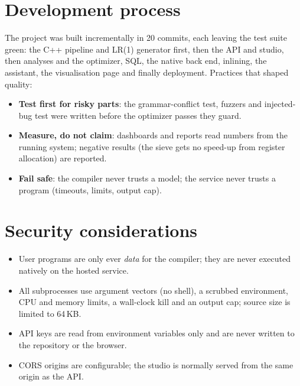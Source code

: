 \documentclass[11pt,a4paper]{article}
\begin{document}
\section{Development process}
The project was built incrementally in 20 commits, each leaving the test suite green: the C++ pipeline and LR(1) generator first, then the API and studio, then analyses and the optimizer, SQL, the native back end, inlining, the assistant, the visualisation page and finally deployment. Practices that shaped quality:
\begin{itemize}
\item \textbf{Test first for risky parts}: the grammar-conflict test, fuzzers and injected-bug test were written before the optimizer passes they guard.
\item \textbf{Measure, do not claim}: dashboards and reports read numbers from the running system; negative results (the sieve gets no speed-up from register allocation) are reported.
\item \textbf{Fail safe}: the compiler never trusts a model; the service never trusts a program (timeouts, limits, output cap).
\end{itemize}

\section{Security considerations}
\begin{itemize}
\item User programs are only ever \emph{data} for the compiler; they are never executed natively on the hosted service.
\item All subprocesses use argument vectors (no shell), a scrubbed environment, CPU and memory limits, a wall-clock kill and an output cap; source size is limited to 64\,KB.
\item API keys are read from environment variables only and are never written to the repository or the browser.
\item CORS origins are configurable; the studio is normally served from the same origin as the API.
\end{itemize}
\end{document}
